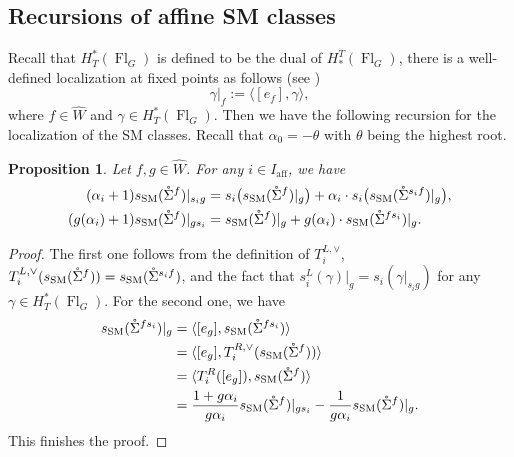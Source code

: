 \documentclass[12pt]{amsart}
\newtheorem{Prop}[Th]{Proposition}
\def\SSM{s_{\rm SM}}
\def\Fl{\operatorname{Fl}}
\def\aff{\operatorname{aff}}
\def\t{g}
\begin{document}
\subsection{Recursions of affine SM classes}
Recall that $H_T^*(\Fl_G)$ is defined to be the dual of $H_*^T(\Fl_G)$, there is a well-defined localization at fixed points  as follows (see \cite[Chapter 4]{LLMSSZ14})
\[\gamma|_f:=\langle [e_f],\gamma\rangle,\]
where $f\in \widehat{W}$ and $\gamma\in H_T^*(\Fl_G)$.
Then we have the following recursion for the localization of the SM classes. Recall that $\alpha_0=-\theta$ with $\theta$ being the highest root.
\begin{Prop}\label{prop:recursion}
Let $f,\t\in \widehat{W}$. 
For any $i\in I_{\aff}$, we have 
\begin{align}
\label{eq:recurofaffineSSML}
    (\alpha_i+1)
    \SSM(\mathring{\Sigma}^{f})|_{s_i\t}
    &=s_i\big(
    \SSM(\mathring{\Sigma}^{f})|_{\t}\big)
    +\alpha_i\cdot s_i\big(\SSM(\mathring{\Sigma}^{s_if})|_{\t}
    \big),
\\
\label{eq:recurofaffineSSMR}
    (\t(\alpha_i)+1)
    \SSM(\mathring{\Sigma}^{f})|_{\t s_i}
    & =
    \SSM(\mathring{\Sigma}^{f})|_{\t}
    +\t(\alpha_i)\cdot \SSM(\mathring{\Sigma}^{fs_i})|_{\t}
    .
\end{align}
\end{Prop}
\begin{proof}
    The first one follows from the definition of $T_i^{L,\vee}$, $T_i^{L,\vee} (\SSM(\mathring{\Sigma}^{f}))=\SSM(\mathring{\Sigma}^{s_if})$, and the fact that $s_i^L(\gamma)|_\t=s_i(\gamma|_{s_i\t})$ for any $\gamma\in H_T^*(\Fl_G)$. For the second one, we have
    \begin{align*}
        \SSM(\mathring{\Sigma}^{fs_i})|_\t&=\langle [e_\t],\SSM(\mathring{\Sigma}^{fs_i})\rangle\\
        &=\langle [e_\t], T_i^{R,\vee}(\SSM(\mathring{\Sigma}^{f}))\rangle\\
        &=\langle T_i^{R}([e_\t]), \SSM(\mathring{\Sigma}^{f})\rangle\\
        &=\frac{1+\t\alpha_i}{\t\alpha_i}\SSM(\mathring{\Sigma}^{f})|_{\t s_i}-\frac{1}{\t\alpha_i}\SSM(\mathring{\Sigma}^{f})|_\t.
    \end{align*}
    This finishes the proof.
\end{proof}
\end{document}
